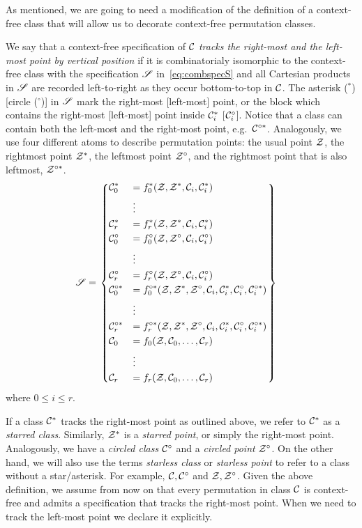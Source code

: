 \documentclass[12pt, a4paper, twoside]{report}
\begin{document}
As mentioned, we are going to need a modification of the definition of a context-free class that will allow us to decorate context-free permutation classes. 
\begin{definition}
  We say that a context-free specification of $\mathcal{C}$ \emph{tracks the right-most and the left-most point by vertical position} if it is combinatorialy isomorphic to the context-free class with the specification $\mathscr{S}$ in~\eqref{eq:combspecS} and all Cartesian products in $\mathscr{S}$ are recorded left-to-right as they occur bottom-to-top in $\mathcal{C}$. The asterisk (${}^*$) [circle (${}^\circ$)] in $\mathscr{S}$ mark the right-most [left-most] point, or the block which contains the right-most [left-most] point inside $\mathcal{C}_i^*$ [$\mathcal{C}_i^\circ$]. Notice that a class can contain both the left-most and the right-most point, e.g.~$\mathcal{C}^{\circ*}$. Analogously, we use four different atoms to describe permutation points: the usual point $\mathcal{Z}$, the rightmost point $\mathcal{Z}^*$, the leftmost point $\mathcal{Z}^\circ$, and the rightmost point that is also leftmost, $\mathcal{Z}^{\circ*}$. 
  \begin{align}
\mathscr{S} &=  \begin{rcases}\begin{dcases}
  \mathcal{C}_0^* &= f_0^*(\mathcal{Z},\mathcal{Z}^*,\mathcal{C}_i, \mathcal{C}_i^*)\\
       &\vdots\\
  \mathcal{C}_r^* &= f_r^*(\mathcal{Z},\mathcal{Z}^*,\mathcal{C}_i, \mathcal{C}_i^*)\\
  \mathcal{C}_0^\circ &= f_0^\circ(\mathcal{Z},\mathcal{Z}^\circ,\mathcal{C}_i,\mathcal{C}_i^\circ)\\
       &\vdots\\
  \mathcal{C}_r^\circ &= f_r^\circ(\mathcal{Z},\mathcal{Z}^\circ,\mathcal{C}_i, \mathcal{C}_i^\circ)\\
  \mathcal{C}_0^{\circ*} &= f_0^{\circ*}(\mathcal{Z},\mathcal{Z}^*,\mathcal{Z}^\circ,\mathcal{C}_i, \mathcal{C}_i^*,\mathcal{C}_i^\circ, \mathcal{C}_i^{\circ *})\\
       &\vdots\\
  \mathcal{C}_r^{\circ*} &= f_r^{\circ*}(\mathcal{Z},\mathcal{Z}^*,\mathcal{Z}^\circ,\mathcal{C}_i, \mathcal{C}_i^*,\mathcal{C}_i^\circ, \mathcal{C}_i^{\circ *})\\
  \mathcal{C}_0 &= f_0(\mathcal{Z},\mathcal{C}_0,\ldots,\mathcal{C}_r)\\
       &\vdots\\
  \mathcal{C}_r &= f_r(\mathcal{Z},\mathcal{C}_0,\ldots,\mathcal{C}_r)
       \end{dcases}
     \end{rcases}
         \label{eq:combspecS}
  \end{align}
  where $0 \leq i \leq r$. 
 \end{definition}

 If a class $\mathcal{C}^*$ tracks the right-most point as outlined above, we refer to $\mathcal{C}^*$ as a \emph{starred class}. Similarly, $\mathcal{Z}^*$ is a \emph{starred point}, or simply the right-most point. Analogously, we have a \emph{circled class} $\mathcal{C}^\circ$ and a \emph{circled point} $\mathcal{Z}^\circ$. On the other hand, we will also use the terms \emph{starless class} or \emph{starless point} to refer to a class without a star/asterisk. For example, $\mathcal{C}, \mathcal{C}^\circ$ and $\mathcal{Z}, \mathcal{Z}^\circ$. Given the above definition, we assume from now on that every permutation in class $\mathcal{C}$ is context-free and admits a specification that tracks the right-most point. When we need to track the left-most point we declare it explicitly.
\end{document}
